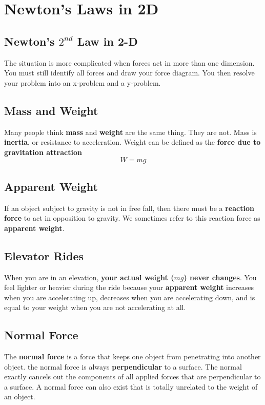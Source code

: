 \section{Newton's Laws in 2D}
	
\subsection{Newton's $2^{nd}$ Law in 2-D}
The situation is more complicated when forces act in more than one dimension. You must still identify all forces and draw your force diagram. You then resolve your problem into an x-problem and a y-problem.
	
\subsection{Mass and Weight}
Many people think \textbf{mass} and \textbf{weight} are the same thing. They are not. Mass is \textbf{inertia}, or resistance to acceleration. Weight can be defined as the \textbf{force due to gravitation attraction} \[W=mg\]
	
\subsection{Apparent Weight}
If an object subject to gravity is not in free fall, then there must be a \textbf{reaction force} to act in opposition to gravity. We sometimes refer to this reaction force as \textbf{apparent weight}.
	
\subsection{Elevator Rides}
When you are in an elevation, \textbf{your actual weight ($mg$) never changes}. You feel lighter or heavier during the ride because your \textbf{apparent weight} increases when you are accelerating up, decreases when you are accelerating down, and is equal to your weight when you are not accelerating at all.
	
\subsection{Normal Force}
The \textbf{normal force} is a force that keeps one object from penetrating into another object. the normal force is always \textbf{perpendicular} to a surface. The normal exactly cancels out the components of all applied forces that are perpendicular to a surface. A normal force can also exist that is totally unrelated to the weight of an object.
	
